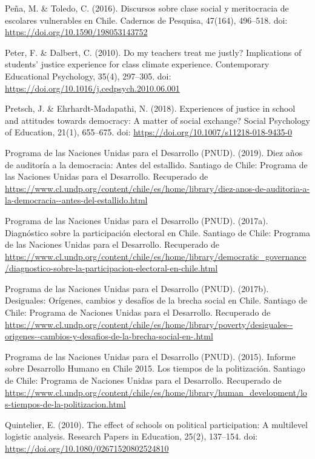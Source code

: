 \documentclass[12pt,twoside]{templates/facsothesis}
\begin{document}
Peña, M. \& Toledo, C. (2016). Discursos sobre clase social y meritocracia de escolares vulnerables en Chile. Cadernos de Pesquisa, 47(164), 496--518. doi: \url{https://doi.org/10.1590/198053143752}

Peter, F. \& Dalbert, C. (2010). Do my teachers treat me justly? Implications of students' justice experience for class climate experience. Contemporary Educational Psychology, 35(4), 297--305. doi: \url{https://doi.org/10.1016/j.cedpsych.2010.06.001}

Pretsch, J. \& Ehrhardt-Madapathi, N. (2018). Experiences of justice in school and attitudes towards democracy: A matter of social exchange? Social Psychology of Education, 21(1), 655--675. doi: \url{https://doi.org/10.1007/s11218-018-9435-0}

Programa de las Naciones Unidas para el Desarrollo (PNUD). (2019). Diez años de auditoría a la democracia: Antes del estallido. Santiago de Chile: Programa de las Naciones Unidas para el Desarrollo. Recuperado de \url{https://www.cl.undp.org/content/chile/es/home/library/diez-anos-de-auditoria-a-la-democracia--antes-del-estallido.html}

Programa de las Naciones Unidas para el Desarrollo (PNUD). (2017a). Diagnóstico sobre la participación electoral en Chile. Santiago de Chile: Programa de las Naciones Unidas para el Desarrollo. Recuperado de \url{https://www.cl.undp.org/content/chile/es/home/library/democratic_governance/diagnostico-sobre-la-participacion-electoral-en-chile.html}

Programa de las Naciones Unidas para el Desarrollo (PNUD). (2017b). Desiguales: Orígenes, cambios y desafíos de la brecha social en Chile. Santiago de Chile: Programa de Naciones Unidas para el Desarrollo. Recuperado de \url{https://www.cl.undp.org/content/chile/es/home/library/poverty/desiguales--origenes--cambios-y-desafios-de-la-brecha-social-en-.html}

Programa de las Naciones Unidas para el Desarrollo (PNUD). (2015). Informe sobre Desarrollo Humano en Chile 2015. Los tiempos de la politización. Santiago de Chile: Programa de Naciones Unidas para el Desarrollo. Recuperado de \url{https://www.cl.undp.org/content/chile/es/home/library/human_development/los-tiempos-de-la-politizacion.html}

Quintelier, E. (2010). The effect of schools on political participation: A multilevel logistic analysis. Research Papers in Education, 25(2), 137--154. doi: \url{https://doi.org/10.1080/02671520802524810}
\end{document}
